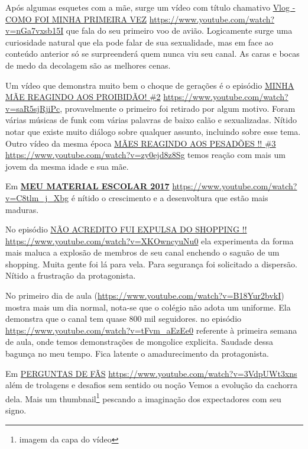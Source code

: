 Após algumas esquetes com a mãe, surge um vídeo com título chamativo \href{https://www.youtube.com/watch?v=nGa7vxsb15I}{Vlog - COMO FOI MINHA PRIMEIRA VEZ} \url{https://www.youtube.com/watch?v=nGa7vxsb15I} que fala do seu primeiro voo de avião. Logicamente surge uma curiosidade natural que ela pode falar de sua sexualidade, mas em face ao conteúdo anterior só se surpreenderá quem nunca viu seu canal. As caras e bocas de medo da decolagem são as melhores cenas.

Um vídeo que demonstra muito bem o choque de gerações é o episódio \href{https://www.youtube.com/watch?v=saR5sjRjiPc}{MINHA MÃE REAGINDO AOS PROIBIDÃO! \#2}
 \url{https://www.youtube.com/watch?v=saR5sjRjiPc}, provavelmente o primeiro foi retirado por algum motivo. Foram várias músicas de funk com várias palavras de baixo calão e sexualizadas. Nítido notar que existe muito diálogo sobre qualquer assunto, incluindo sobre esse tema. Outro vídeo da mesma época \href{https://www.youtube.com/watch?v=zy0ejd8z8Sg}{MÃES REAGINDO AOS PESADÕES !! \#3} \url{https://www.youtube.com/watch?v=zy0ejd8z8Sg} temos reação com mais um jovem da mesma idade e sua mãe.

Em \href{https://www.youtube.com/watch?v=C8tlm_j_Xbg}{\textbf{MEU MATERIAL ESCOLAR 2017}} \url{https://www.youtube.com/watch?v=C8tlm_j_Xbg} é nítido o crescimento e a desenvoltura que estão mais maduras.

No episódio \href{https://www.youtube.com/watch?v=XKOwncyuNu0}{NÃO ACREDITO FUI EXPULSA DO SHOPPING !!} \url{https://www.youtube.com/watch?v=XKOwncyuNu0} ela experimenta da forma mais maluca a explosão de membros de seu canal enchendo o saguão de um shopping. Muita gente foi lá para vela. Para segurança foi solicitado a dispersão. Nítido a frustração da protagonista.

No primeiro dia de aula (\url{https://www.youtube.com/watch?v=B18Yur2bvkI}) mostra mais um dia normal, nota-se que o colégio não adota um uniforme. Ela demonstra que o canal tem quase 800 mil seguidores. no episódio \url{https://www.youtube.com/watch?v=tFvm_aEzEe0} referente à primeira semana de aula, onde temos demonstrações de mongolice explicita. Saudade dessa bagunça no meu tempo. Fica latente o amadurecimento da protagonista.

Em \href{https://www.youtube.com/watch?v=3VdpUWt3xns}{PERGUNTAS DE FÃS} \url{https://www.youtube.com/watch?v=3VdpUWt3xns} além de trolagens e desafios sem sentido ou noção Vemos a evolução da cachorra dela. Mais um thumbnail\footnote{imagem da capa do vídeo} pescando a imaginação dos expectadores com seu signo.




